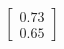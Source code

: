 \documentclass[preview]{standalone}
\begin{document}
\begin{align*}
\begin{bmatrix} 0.73 \\ 0.65 \end{bmatrix}
\end{align*}
\end{document}

